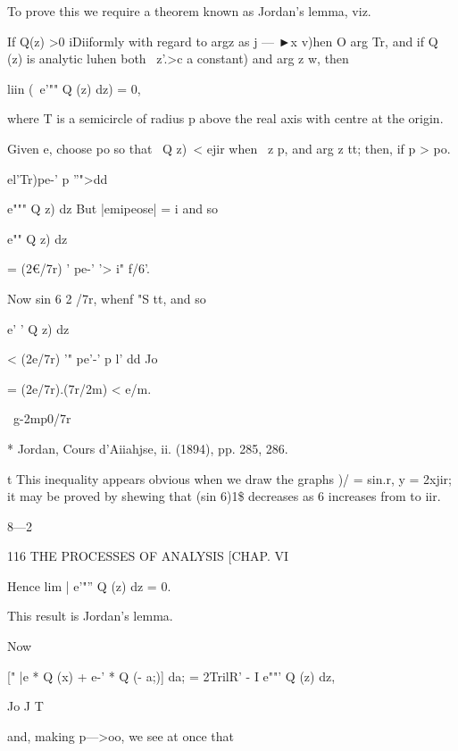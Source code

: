 To prove this we require a theorem known as Jordan's lemma, viz. 

If Q(z) >0 iDiiformly with regard to argz as j  — ►x v)hen O arg Tr, 
and if Q (z) is analytic luhen both \ z'.>c a constant) and   arg z  w, then 

liin (\ e'"" Q (z) dz) = 0, 

where T is a semicircle of radius p above the real axis with centre at the origin. 

Given e, choose po so that \ Q z)\ <  ejir when \ z  p,  and   arg z   tt; 
then, if p > po. 



 el'Tr)pe-' p ''">dd 



e"""  Q  z) dz 
But |emipeose| = i  and so 

e""  Q  z) dz 



= (2€/7r)   ' pe-' '> i" f/6'. 



Now sin 6   2 /7r, whenf "S     tt, and so 



e' '  Q  z) dz 



< (2e/7r) '" pe'-' p l' dd 
Jo 



= (2e/7r).(7r/2m) 
< e/m. 



\  g-2mp0/7r 



* Jordan, Cours d'Aiiahjse, ii. (1894), pp. 285, 286. 

t This inequality appears obvious when we draw the graphs )/ = sin.r, y = 2xjir; it may be 
proved by shewing that (sin 6)1\$ decreases as 6 increases from to iir. 

8—2 



116 THE PROCESSES OF ANALYSIS [CHAP. VI 



Hence lim | e'"'' Q (z) dz = 0. 



This result is Jordan's lemma. 

Now 

[" |e *  Q (x) + e-' *  Q (- a;)] da; = 2TrilR' - I e""'  Q (z) dz, 

Jo J T 

and, making p—>oo, we see at once that 

